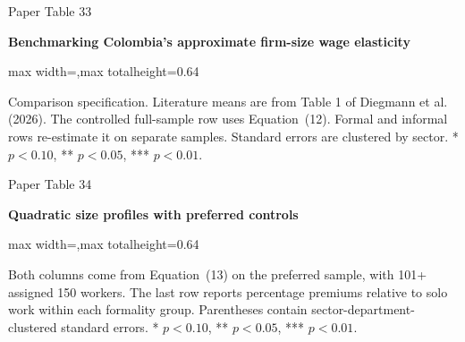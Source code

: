 \begin{frame}{Paper Table 33}
\begin{minipage}{\textwidth}\small\textbf{Benchmarking Colombia's approximate firm-size wage elasticity}\end{minipage}\par\vspace{0.15cm}
\centering\begingroup\fontsize{8.5}{10}\selectfont
\setlength{\tabcolsep}{4pt}\renewcommand{\arraystretch}{1.06}
\begin{adjustbox}{max width=\textwidth,max totalheight=0.64\textheight}

\end{adjustbox}\endgroup\par\vspace{0.10cm}
{\fontsize{6.5}{7.5}\selectfont\raggedright Comparison specification. Literature means are from Table 1 of Diegmann et al. (2026). The controlled full-sample row uses Equation~(12). Formal and informal rows re-estimate it on separate samples. Standard errors are clustered by sector. * $p<0.10$, ** $p<0.05$, *** $p<0.01$.\par}
\end{frame}

\begin{frame}{Paper Table 34}
\begin{minipage}{\textwidth}\small\textbf{Quadratic size profiles with preferred controls}\end{minipage}\par\vspace{0.15cm}
\centering\begingroup\fontsize{8.5}{10}\selectfont
\setlength{\tabcolsep}{4pt}\renewcommand{\arraystretch}{1.06}
\begin{adjustbox}{max width=\textwidth,max totalheight=0.64\textheight}

\end{adjustbox}\endgroup\par\vspace{0.10cm}
{\fontsize{6.5}{7.5}\selectfont\raggedright Both columns come from Equation~(13) on the preferred sample, with 101+ assigned 150 workers. The last row reports percentage premiums relative to solo work within each formality group. Parentheses contain sector-department-clustered standard errors. * $p<0.10$, ** $p<0.05$, *** $p<0.01$.\par}
\end{frame}

